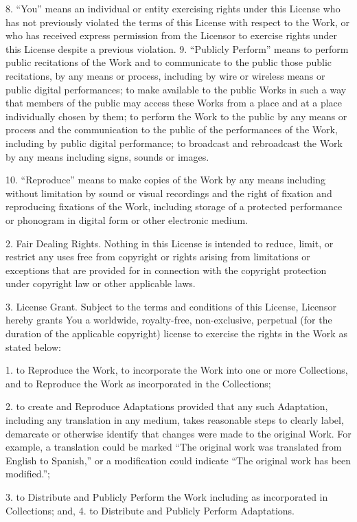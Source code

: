 8. ``You'' means an individual or entity exercising rights under this
License who has not previously violated the terms of this License
with respect to the Work, or who has received express permission
from the Licensor to exercise rights under this License despite a
previous violation. 9. ``Publicly Perform'' means to perform public
recitations of the Work and to communicate to the public those
public recitations, by any means or process, including by wire or
wireless means or public digital performances; to make available to
the public Works in such a way that members of the public may
access these Works from a place and at a place individually chosen
by them; to perform the Work to the public by any means or process
and the communication to the public of the performances of the
Work, including by public digital performance; to broadcast and
rebroadcast the Work by any means including signs, sounds or
images.

10. ``Reproduce'' means to make copies of the Work by any means
including without limitation by sound or visual recordings and the
right of fixation and reproducing fixations of the Work, including
storage of a protected performance or phonogram in digital form or
other electronic medium.

2. Fair Dealing Rights. Nothing in this License is intended to
reduce, limit, or restrict any uses free from copyright or rights
arising from limitations or exceptions that are provided for in
connection with the copyright protection under copyright law or
other applicable laws.

3. License Grant. Subject to the terms and conditions of this
License, Licensor hereby grants You a worldwide, royalty-free,
non-exclusive, perpetual (for the duration of the applicable
copyright) license to exercise the rights in the Work as stated
below:

1. to Reproduce the Work, to incorporate the Work into one or more
Collections, and to Reproduce the Work as incorporated in the
Collections;

2. to create and Reproduce Adaptations provided that any such
Adaptation, including any translation in any medium, takes
reasonable steps to clearly label, demarcate or otherwise identify
that changes were made to the original Work. For example, a
translation could be marked ``The original work was translated from
English to Spanish,'' or a modification could indicate ``The original
work has been modified.'';

3. to Distribute and Publicly Perform the Work including as
incorporated in Collections; and, 4. to Distribute and Publicly
Perform Adaptations.


